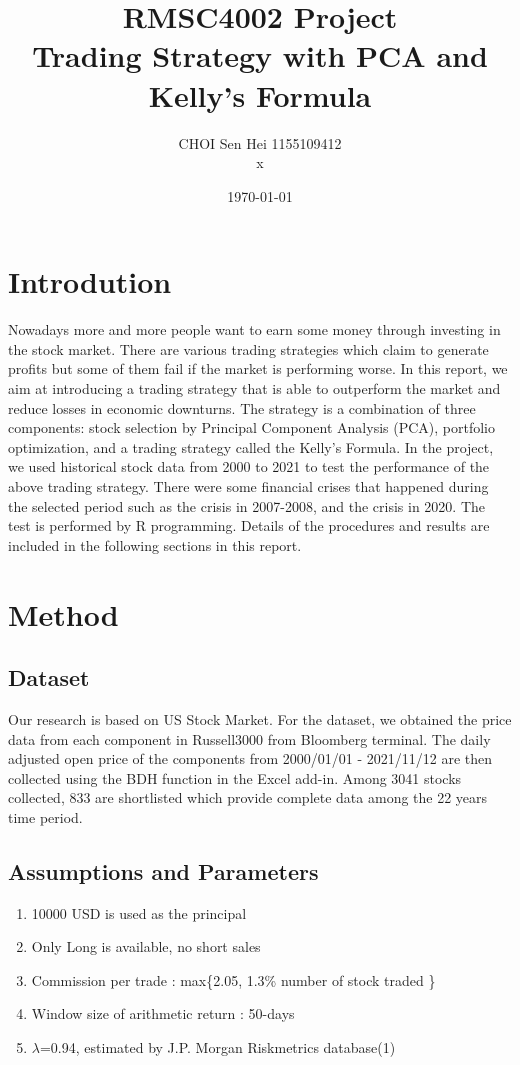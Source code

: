 \documentclass[11pts]{article}
\author{CHOI Sen Hei 1155109412 \\
x}
\date{\today}
\title{RMSC4002 Project \\
Trading Strategy with PCA and Kelly's Formula \\
}
\begin{document}
\maketitle
\tableofcontents


\section{Introdution}
\label{sec:orgf312760}
Nowadays more and more people want to earn some money through investing in the stock market. There are various trading strategies which claim to generate profits but some of them fail if the market is performing worse. In this report, we aim at introducing a trading strategy that is able to outperform the market and reduce losses in economic downturns. The strategy is a combination of three components: stock selection by Principal Component Analysis (PCA), portfolio optimization, and a trading strategy called the Kelly's Formula. 
In the project, we used historical stock data from 2000 to 2021 to test the performance of the above trading strategy. There were some financial crises that happened during the selected period such as the crisis in 2007-2008, and the crisis in 2020. The test is performed by R programming. Details of the procedures and results are included in the following sections in this report.

\section{Method}
\label{sec:org6462d79}
\subsection{Dataset}
\label{sec:orge4ee10e}
Our research is based on US Stock Market. For the dataset, we obtained the price data from each component in Russell3000 from Bloomberg terminal. The daily adjusted open price of the components from 2000/01/01 - 2021/11/12 are then collected using the BDH function in the Excel add-in. Among 3041 stocks collected, 833 are shortlisted which provide complete data among the 22 years time period.
\subsection{Assumptions and Parameters}
\label{sec:orgdb0bad9}
\begin{enumerate}
\item 10000 USD is used as the principal
\item Only Long is available, no short sales
\item Commission per trade : max\{2.05, 1.3\% \texttimes{} number of stock traded \}
\item Window size of arithmetic return : 50-days
\item \(\lambda\)=0.94, estimated by J.P. Morgan Riskmetrics database(1)
\end{enumerate}
\end{document}
